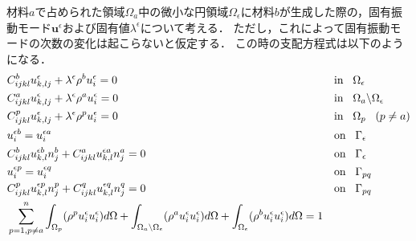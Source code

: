 材料$a$で占められた領域$\Omega_a$中の微小な円領域$\Omega_\epsilon$に材料$b$が生成した際の，固有振動モード$\bm{u}^{\epsilon}$および固有値$\lambda^{\epsilon}$について考える．
ただし，これによって固有振動モードの次数の変化は起こらないと仮定する．
この時の支配方程式は以下のようになる．
\begin{align}
	&C_{ijkl}^{b}u_{k,lj}^{\epsilon}+\lambda^{\epsilon}\rho^{b} u_{i}^{\epsilon}=0&&\text{in}\hspace{0.3cm}\Omega_{\epsilon}
	\label{eq:govepmain}
	\\
	&C_{ijkl}^{a}u_{k,lj}^{\epsilon}+\lambda^{\epsilon}\rho^{a} u_{i}^{\epsilon}=0&&\text{in}\hspace{0.3cm}\Omega_{a}\backslash\Omega_{\epsilon}
	\label{eq:govepmain}
	\\
	&C_{ijkl}^{p}u_{k,lj}^{\epsilon}+\lambda^{\epsilon}\rho^{p} u_{i}^{\epsilon}=0&&\text{in}\hspace{0.3cm}\Omega_{p}\hspace{0.3cm}(p\neq a)
	\label{eq:govepmain}
	\\
	&u_{i}^{\epsilon b}=u_{i}^{\epsilon a} &&\text{on}\hspace{0.3cm}\Gamma_{\epsilon}
	\\
	&C_{ijkl}^{b}u_{k,l}^{\epsilon b}n_{j}^{b}+C_{ijkl}^{a}u_{k,l}^{\epsilon a}n_{j}^{a}=0 &&\text{on}\hspace{0.3cm}\Gamma_{\epsilon}
	\label{eq:govepbc}
	\\
	&u_{i}^{\epsilon p}=u_{i}^{\epsilon q} &&\text{on}\hspace{0.3cm}\Gamma_{pq}
	\\
	&C_{ijkl}^{p}u_{k,l}^{\epsilon p}n_{j}^{p}+C_{ijkl}^{q}u_{k,l}^{\epsilon q}n_{j}^{q}=0 &&\text{on}\hspace{0.3cm}\Gamma_{pq}
	\label{eq:govepbc}
	\\
	&\sum_{p=1,p\neq a}^{n}\int_{\Omega_p}(\rho^{p}u_{i}^{\epsilon}u_{i}^{\epsilon}) d\Omega
	+\int_{\Omega_a\backslash\Omega_{\epsilon}}(\rho^{a}u_{i}^{\epsilon}u_{i}^{\epsilon}) d\Omega
	+\int_{\Omega_{\epsilon}}(\rho^{b}u_{i}^{\epsilon}u_{i}^{\epsilon}) d\Omega=1
	\label{eq:govepnorm}
\end{align}

